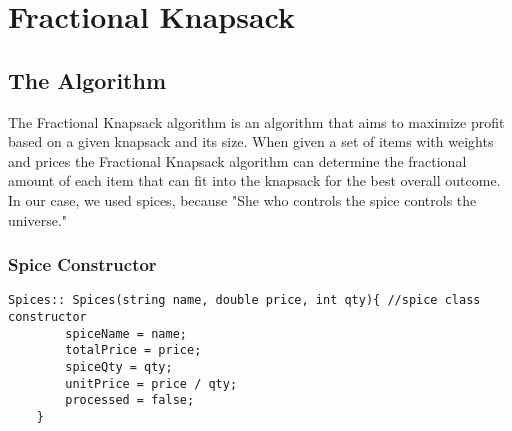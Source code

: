 \documentclass[letterpaper, 10pt,DIV=13]{scrartcl}
\numberwithin{equation}{section} %
\numberwithin{figure}{section} %
\numberwithin{table}{section} %
\begin{document}
\section{Fractional Knapsack}

\subsection{The Algorithm}
The Fractional Knapsack algorithm is an algorithm that aims to maximize profit based on a given knapsack and its size. When given a set of items with weights and prices the Fractional Knapsack algorithm can determine the fractional amount of each item that can fit into the knapsack for the best overall outcome. In our case, we used spices, because "She who controls the spice controls the universe."

\subsubsection*{Spice Constructor}
    \lstset{numbers=left, numberstyle=\tiny, stepnumber=1, numbersep=5pt, basicstyle=\footnotesize\ttfamily}
    \begin{lstlisting}[frame=single, ]
    Spices:: Spices(string name, double price, int qty){ //spice class constructor
        spiceName = name;
        totalPrice = price;
        spiceQty = qty;
        unitPrice = price / qty;
        processed = false;
    }
\end{lstlisting}

\pagebreak
\end{document}
